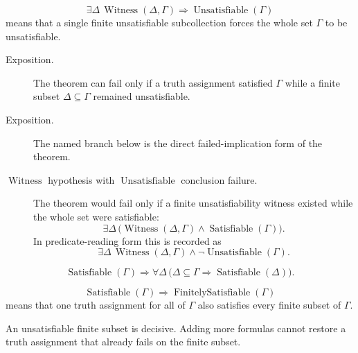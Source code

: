 \begin{remark*}
\[
\exists\Delta\,\operatorname{Witness}(\Delta,\Gamma)
\Rightarrow
\operatorname{Unsatisfiable}(\Gamma)
\]
means that a single finite unsatisfiable subcollection forces the whole set
\(\Gamma\) to be unsatisfiable.
\end{remark*}

\begin{remark*}
\begin{description}
  \item[Exposition.] The theorem can fail only if a truth assignment satisfied \(\Gamma\) while a
finite subset \(\Delta\subseteq\Gamma\) remained unsatisfiable.
\end{description}
\end{remark*}

\begin{remark*}
\begin{description}
  \item[Exposition.] The named branch below is the direct failed-implication
  form of the theorem.
  \item[\(\operatorname{Witness}\) hypothesis with \(\operatorname{Unsatisfiable}\) conclusion failure.] The theorem would fail only if a finite
  unsatisfiability witness existed while the whole set were satisfiable:
  \[
  \exists\Delta\,\bigl(\operatorname{Witness}(\Delta,\Gamma)
  \land
  \operatorname{Satisfiable}(\Gamma)\bigr).
  \]
  In predicate-reading form this is recorded as
  \[
  \exists\Delta\,\operatorname{Witness}(\Delta,\Gamma)
  \land
  \neg\operatorname{Unsatisfiable}(\Gamma).
  \]
\end{description}
\end{remark*}

\begin{remark*}
\[
\operatorname{Satisfiable}(\Gamma)
\Rightarrow
\forall\Delta\,\bigl(\Delta\subseteq\Gamma\Rightarrow
\operatorname{Satisfiable}(\Delta)\bigr).
\]
\end{remark*}

\begin{remark*}
\[
\operatorname{Satisfiable}(\Gamma)
\Rightarrow
\operatorname{FinitelySatisfiable}(\Gamma)
\]
means that one truth assignment for all of \(\Gamma\) also satisfies every
finite subset of \(\Gamma\).
\end{remark*}

\begin{remark*}[Interpretation]
An unsatisfiable finite subset is decisive. Adding more formulas cannot restore
a truth assignment that already fails on the finite subset.
\end{remark*}

